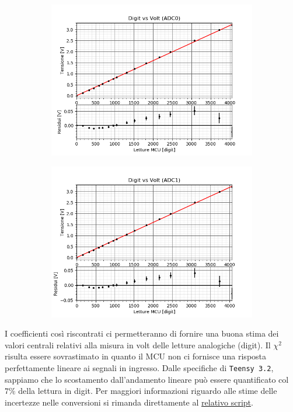 \documentclass{article}[a4paper, oneside, 11pt]
\begin{document}
\begin{figure}[H]
\centering
\begin{subfigure}{.5\textwidth}
	\centering 
 		\includegraphics[scale=0.5]{./digitvsvolt_ADC0_1.png}
	\label{fig: nofilter}
\end{subfigure}%
\begin{subfigure} {.5\textwidth}
	\centering 
		\includegraphics[scale=0.5]{./digitvsvolt_ADC1_1.png}
	\label{fig: filtered}
\end{subfigure}
\end{figure}

I coefficienti così riscontrati ci permetteranno di fornire una buona stima 
dei valori centrali relativi alla misura in volt delle letture analogiche 
(digit). Il $\chi^2$ risulta essere sovrastimato in quanto il MCU non ci 
fornisce una risposta perfettamente lineare ai segnali in ingresso. Dalle 
specifiche di \verb+Teensy 3.2+, sappiamo che lo scostamento dall’andamento lineare 
può essere quantificato col $7 \%$ della lettura in digit.\newline
Per maggiori informazioni riguardo alle stime delle incertezze nelle 
conversioni si rimanda direttamente al 
\href{https://github.com/LucaCiucci/relaz_seme/blob/master/Cartella_fit/funzioni.py}{relativo script}.
\end{document}
